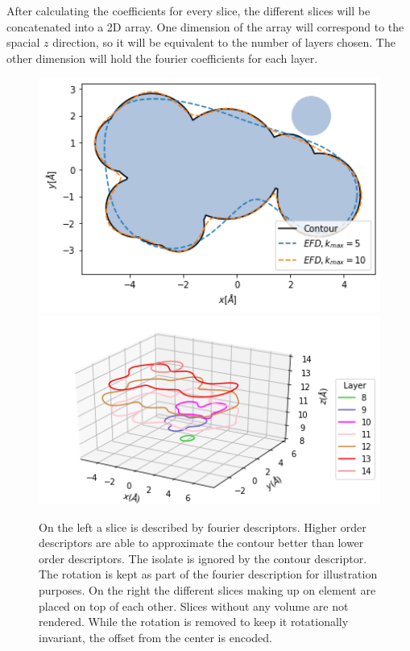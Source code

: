After calculating the coefficients for every slice, the different slices will be concatenated into a 2D array.
One dimension of the array will correspond to the spacial $z$ direction, so it will be equivalent to the number of layers chosen.
The other dimension will hold the fourier coefficients for each layer.
\begin{figure}[H]
    \includegraphics[width=1.0\textwidth]{figures/fourier/contour.png}
  \endminipage\hfill
    \includegraphics[width=1.0\textwidth]{figures/fourier/fourier-slices.png}
  \endminipage
  \caption[Slices produced by LEFD encoder]{
  On the left a slice is described by fourier descriptors. Higher order descriptors are able to approximate the contour better than lower order descriptors. 
  The isolate is ignored by the contour descriptor. The rotation is kept as part of the fourier description for illustration purposes.
  On the right the different slices making up on element are placed on top of each other. Slices without any volume are not rendered. 
  While the rotation is removed to keep it rotationally invariant, the offset from the center is encoded.
  }
  \label{fig:slice-layered}
\end{figure}

